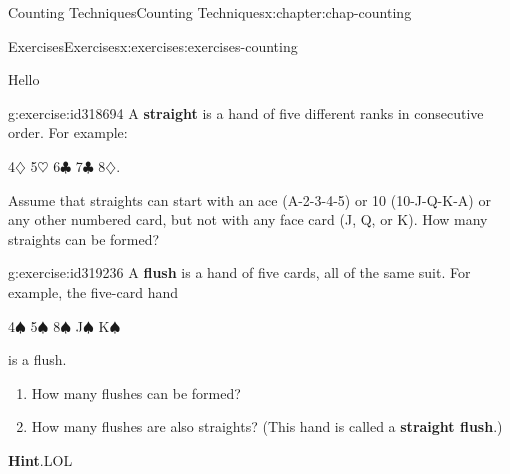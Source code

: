 \documentclass[oneside,10pt,]{book}
\newcommand{\blocktitlefont}{\relax}
\newcommand{\terminology}[1]{\textbf{#1}}
\numberwithin{equation}{section}
\begin{document}
\begin{chapterptx}{Counting Techniques}{}{Counting Techniques}{}{}{x:chapter:chap-counting}
%
%
\typeout{************************************************}
\typeout{************************************************}
%
\begin{exercises-section}{Exercises}{}{Exercises}{}{}{x:exercises:exercises-counting}
\begin{introduction}{}%
Hello%
\end{introduction}%
\begin{divisionexercise}{1}{}{}{g:exercise:id318694}%
A \terminology{straight} is a hand of five different ranks in consecutive order. For example:%
\begin{sidebyside}{1}{0.3}{0.3}{0}%
\begin{sbspanel}{0.4}%
4\(\diamondsuit\) 5\(\heartsuit\) 6\(\clubsuit\) 7\(\clubsuit\) 8\(\diamondsuit\).%
\end{sbspanel}%
\end{sidebyside}%
\par
Assume that straights can start with an ace (A-2-3-4-5) or 10 (10-J-Q-K-A) or any other numbered card, but not with any face card (J, Q, or K). How many straights can be formed?%
\end{divisionexercise}%
\begin{divisionexercise}{2}{}{}{g:exercise:id319236}%
A \terminology{flush} is a hand of five cards, all of the same suit. For example, the five-card hand%
\begin{sidebyside}{1}{0.3}{0.3}{0}%
\begin{sbspanel}{0.4}%
4\(\spadesuit\) 5\(\spadesuit\) 8\(\spadesuit\) J\(\spadesuit\) K\(\spadesuit\)%
\end{sbspanel}%
\end{sidebyside}%
\par
is a flush.%
\par
%
\begin{enumerate}[label=(\alph*)]
\item{}How many flushes can be formed?%
\item{}How many flushes are also straights? (This hand is called a \terminology{straight flush}.)%
\end{enumerate}
%
\par\smallskip%
\noindent\textbf{\blocktitlefont Hint}.\hypertarget{g:hint:id319559}{}\quad{}LOL%
\end{divisionexercise}%
\end{exercises-section}
\end{chapterptx}
%
%
\typeout{************************************************}
\end{document}

